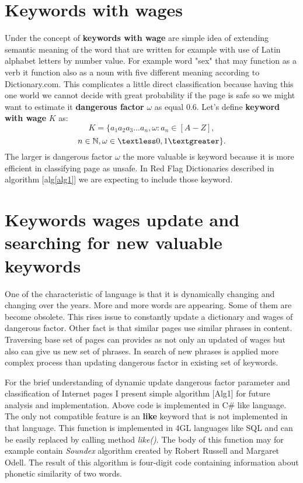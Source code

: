\documentclass[9pt,a4paper]{extarticle}
\begin{document}
\begin{multicols}{2}
\section{Keywords with wages}
Under the concept of \textbf{keywords with wage} are simple idea of extending semantic meaning of the word that are written for example with use of Latin alphabet letters by number value. For example word "sex" that may function as a verb it function also as a noun with five different meaning according to Dictionary.com\cite{noauthor_dictionary.com_2018}. This complicates a little direct classification because having this one world we cannot decide with great probability if the page is safe so we might want to estimate it \textbf{dangerous factor} \(\omega\) as equal 0.6. Let's define \textbf{keyword with wage} \(K\) as:
$$
K = \{a_1a_2a_3...a_n, \omega : a_n \in [A-Z], 
$$
$$
n \in \mathbb{N}, \omega \in \textless0,1\textgreater\}.
$$
The larger is dangerous factor \(\omega\) the more valuable is keyword because it is more efficient in classifying page as unsafe. In Red Flag Dictionaries described in algorithm [alg\ref{alg1}] we are expecting to include those keyword. 

\section{Keywords wages update and searching for new valuable keywords}
One of the characteristic of language is that it is dynamically changing and changing over the years.  More and more words are appearing. Some of them are become obsolete. This rises issue to constantly update a dictionary and wages of dangerous factor. Other fact is that similar pages use similar phrases in content. Traversing base set of pages can provides as not only an updated of wages but also can give us new set of phrases. In search of new phrases is applied more complex process than updating dangerous factor in existing set of keywords.

For the brief understanding of dynamic update dangerous factor parameter and classification of Internet pages I present simple algorithm [Alg1] for future analysis and implementation. Above code is implemented in C\# like language. The only not compatible feature is an \textbf{like} keyword that is not implemented in that language. This function is implemented in 4GL languages like SQL and can be easily replaced by calling method \textit{like()}. The body of this function may for example contain \textit{Soundex} algorithm created by Robert Russell and Margaret Odell\cite{donald_e._knuth_art_2002}. The result of this algorithm is four-digit code containing information about phonetic similarity of two words.


\end{multicols}
\end{document}
